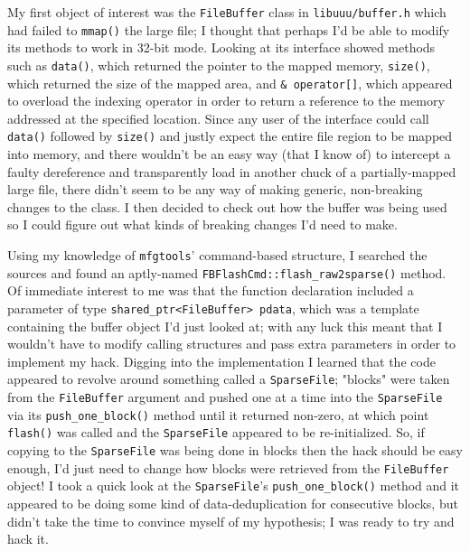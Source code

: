 \documentclass{article}
\begin{document}
My first object of interest was the \texttt{FileBuffer} class in \texttt{libuuu/buffer.h} which had failed to \texttt{mmap()} the large file; I thought that perhaps I'd be able to modify its methods to work in 32-bit mode.  Looking at its interface showed methods such as \texttt{data()}, which returned the pointer to the mapped memory, \texttt{size()}, which returned the size of the mapped area, and \verb|& operator[]|, which appeared to overload the indexing operator in order to return a reference to the memory addressed at the specified location.  Since any user of the interface could call \texttt{data()} followed by \texttt{size()} and justly expect the entire file region to be mapped into memory, and there wouldn't be an easy way (that I know of) to intercept a faulty dereference and transparently load in another chuck of a partially-mapped large file, there didn't seem to be any way of making generic, non-breaking changes to the class.  I then decided to check out how the buffer was being used so I could figure out what kinds of breaking changes I'd need to make.

Using my knowledge of \texttt{mfgtools}' command-based structure, I searched the sources and found an aptly-named \texttt{FBFlashCmd::flash_raw2sparse()} method.  Of immediate interest to me was that the function declaration included a parameter of type \texttt{shared_ptr<FileBuffer> pdata}, which was a template containing the buffer object I'd just looked at; with any luck this meant that I wouldn't have to modify calling structures and pass extra parameters in order to implement my hack.  Digging into the implementation I learned that the code appeared to revolve around something called a \texttt{SparseFile}; "blocks" were taken from the \texttt{FileBuffer} argument and pushed one at a time into the \texttt{SparseFile} via its \texttt{push_one_block()} method until it returned non-zero, at which point \texttt{flash()} was called and the \texttt{SparseFile} appeared to be re-initialized.  So, if copying to the \texttt{SparseFile} was being done in blocks then the hack should be easy enough, I'd just need to change how blocks were retrieved from the \texttt{FileBuffer} object!  I took a quick look at the \texttt{SparseFile}'s \texttt{push_one_block()} method and it appeared to be doing some kind of data-deduplication for consecutive blocks, but didn't take the time to convince myself of my hypothesis; I was ready to try and hack it.
\end{document}
